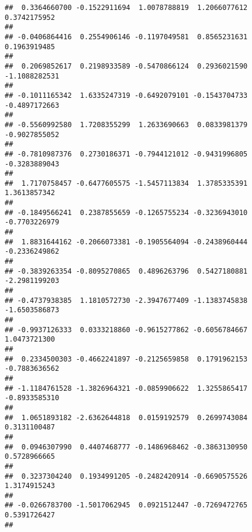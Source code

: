 \documentclass[]{article}
\begin{document}
\begin{verbatim}
##  0.3364660700 -0.1522911694  1.0078788819  1.2066077612  0.3742175952 
##                                                                       
## -0.0406864416  0.2554906146 -0.1197049581  0.8565231631  0.1963919485 
##                                                                       
##  0.2069852617  0.2198933589 -0.5470866124  0.2936021590 -1.1088282531 
##                                                                       
## -0.1011165342  1.6335247319 -0.6492079101 -0.1543704733 -0.4897172663 
##                                                                       
## -0.5560992580  1.7208355299  1.2633690663  0.0833981379 -0.9027855052 
##                                                                       
## -0.7810987376  0.2730186371 -0.7944121012 -0.9431996805 -0.3283889043 
##                                                                       
##  1.7170758457 -0.6477605575 -1.5457113834  1.3785335391  1.3613857342 
##                                                                       
## -0.1849566241  0.2387855659 -0.1265755234 -0.3236943010 -0.7703226979 
##                                                                       
##  1.8831644162 -0.2066073381 -0.1905564094 -0.2438960444 -0.2336249862 
##                                                                       
## -0.3839263354 -0.8095270865  0.4896263796  0.5427180881 -2.2981199203 
##                                                                       
## -0.4737938385  1.1810572730 -2.3947677409 -1.1383745838 -1.6503586873 
##                                                                       
## -0.9937126333  0.0333218860 -0.9615277862 -0.6056784667  1.0473721300 
##                                                                       
##  0.2334500303 -0.4662241897 -0.2125659858  0.1791962153 -0.7883636562 
##                                                                       
## -1.1184761528 -1.3826964321 -0.0859906622  1.3255865417 -0.8933585310 
##                                                                       
##  1.0651893182 -2.6362644818  0.0159192579  0.2699743084  0.3131100487 
##                                                                       
##  0.0946307990  0.4407468777 -0.1486968462 -0.3863130950  0.5728966665 
##                                                                       
##  0.3237304240  0.1934991205 -0.2482420914 -0.6690575526  1.3174915243 
##                                                                       
## -0.0266783700 -1.5017062945  0.0921512447 -0.7269472765  0.5391726427 
##                                                                       

\end{verbatim}
\end{document}
